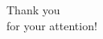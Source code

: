 \documentclass[usenames,dvipsnames]{beamer}
\begin{document}
\begin{frame}

\begin{center}

 \LARGE
Thank you\\

for your attention!

\end{center}
\end{frame}
\end{document}
